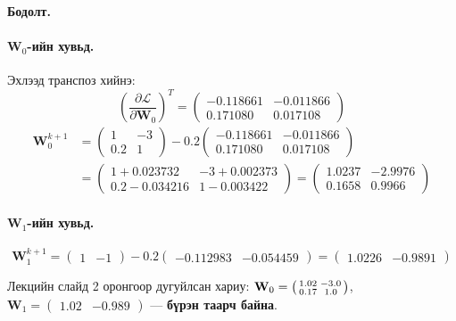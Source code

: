 \documentclass[11pt]{article}
\newenvironment{solution}[1][\textbf{Бодолт.}]
    { \noindent #1 \smallskip \\ }
    { \medskip }
\newcommand{\dL}[1]{\frac{\partial \mathcal{L}}{\partial #1}}
\begin{document}
\begin{solution}
\paragraph{$\mathbf{W}_0$-ийн хувьд.} Эхлээд транспоз хийнэ:
\[
\left(\dL{\mathbf{W}_0}\right)^{T} =
\begin{pmatrix} -0.118661 & -0.011866 \\ 0.171080 & 0.017108 \end{pmatrix}
\]
\begin{align}
\mathbf{W}_0^{k+1}
&= \begin{pmatrix} 1 & -3 \\ 0.2 & 1 \end{pmatrix}
 - 0.2\begin{pmatrix} -0.118661 & -0.011866 \\ 0.171080 & 0.017108 \end{pmatrix} \nonumber\\[4pt]
&= \begin{pmatrix} 1 + 0.023732 & -3 + 0.002373 \\ 0.2 - 0.034216 & 1 - 0.003422 \end{pmatrix}
 = \begin{pmatrix} \mathbf{1.0237} & \mathbf{-2.9976} \\ \mathbf{0.1658} & \mathbf{0.9966} \end{pmatrix}
\end{align}

\paragraph{$\mathbf{W}_1$-ийн хувьд.}
\begin{equation}
\mathbf{W}_1^{k+1}
= \begin{pmatrix} 1 & -1 \end{pmatrix}
 - 0.2\begin{pmatrix} -0.112983 & -0.054459 \end{pmatrix}
= \begin{pmatrix} \mathbf{1.0226} & \mathbf{-0.9891} \end{pmatrix}
\end{equation}

Лекцийн слайд 2 оронгоор дугуйлсан хариу:
$\mathbf{W}_0 = \begin{psmallmatrix} 1.02 & -3.0 \\ 0.17 & 1.0 \end{psmallmatrix}$,
$\mathbf{W}_1 = \begin{pmatrix} 1.02 & -0.989 \end{pmatrix}$ — \textbf{бүрэн таарч байна}.


\end{solution}
\end{document}
